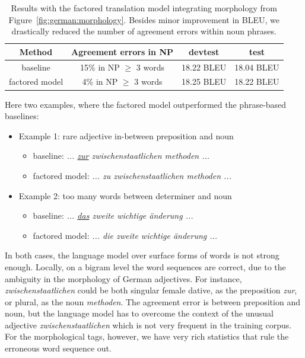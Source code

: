 \documentclass[11pt]{report}
\theoremstyle{plain}
\begin{document}
{\begin{table}
\begin{center}
\begin{tabular}{|c|c|c|c|} \hline
\bf Method & \bf Agreement errors in NP & \bf devtest & \bf test\\ \hline
baseline & 15\% in NP $\ge$ 3 words & 18.22 BLEU & 18.04 BLEU \\ \hline
factored model & 4\% in NP $\ge$ 3 words & 18.25 BLEU & 18.22 BLEU \\ \hline
\end{tabular}
\end{center}
\caption{Results with the factored translation model integrating morphology from Figure~\ref{fig:german:morphology}. Besides minor improvement in BLEU, we drastically reduced the number of agreement errors within noun phrases.}
\label{tab:german:morphology}
\end{table}

Here two examples, where the factored model outperformed the phrase-based baselines:
\begin{itemize}
\item Example 1: rare adjective in-between preposition and noun
\begin{itemize}
\item baseline: {\em ... \underline{zur} zwischenstaatlichen methoden ...}
\item factored model: {\em ... zu zwischenstaatlichen methoden ... }
\end{itemize}
\item Example 2: too many words between determiner and noun
\begin{itemize}
\item baseline: {\em ... \underline{das} zweite wichtige {\"a}nderung ...}
\item factored model: {\em ... die zweite wichtige {\"a}nderung ... }
\end{itemize}
\end{itemize}

In both cases, the language model over surface forms of words is not strong enough. Locally, on a bigram level the word sequences are correct, due to the ambiguity in the morphology of German adjectives. For instance, {\em zwischenstaatlichen} could be both singular female dative, as the preposition {\em zur}, or plural, as the noun {\em methoden}. The agreement error is between preposition and noun, but the language model has to overcome the context of the unusual adjective {\em zwischenstaatlichen} which is not very frequent in the training corpus. For the morphological tags, however, we have very rich statistics that rule the erroneous word sequence out.

}
\end{document}
